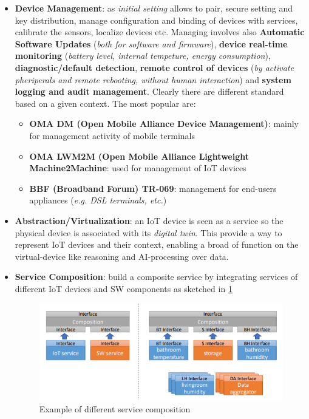 \documentclass[10pt,a4paper]{report}
\theoremstyle{definition}
\begin{document}
\begin{itemize}
	\item 
	\textbf{Device Management}: as \textit{initial setting} allows to pair, secure setting and key distribution, manage configuration and binding of devices with services, calibrate the sensors, localize devices etc. Managing involves also \textbf{Automatic Software Updates} (\textit{both for software and firmware}), \textbf{device real-time monitoring} (\textit{battery level, internal tempeture, energy consumption}), \textbf{diagnostic/default detection}, \textbf{remote control of devices} (\textit{by activate pheriperals and remote rebooting, without human interaction}) and \textbf{system logging and audit management}.
	Clearly there are different standard based on a given context. The most popular are:
	\begin{itemize}
		\item 
		\textbf{OMA DM (Open Mobile Alliance Device Management)}: mainly for management activity of mobile terminals
		\item 
		\textbf{OMA LWM2M (Open Mobile Alliance Lightweight Machine2Machine}: used for management of IoT devices
		\item 
		\textbf{BBF (Broadband Forum) TR-069}: management for end-users appliances (\textit{e.g. DSL terminals, etc.})
	\end{itemize}
	\item 
	\textbf{Abstraction/Virtualization}: an IoT device is seen as a service so the physical device is associated with its \textit{digital twin}. This provide a way to represent IoT devices and their context, enabling a broad of function on the virtual-device like reasoning and AI-processing over data.
	\item 
	\textbf{Service Composition}: build a composite service by integrating services of different IoT devices and SW components as sketched in \ref{composite-integration}
	\begin{figure}[h]
		\centering
		\includegraphics[scale=0.70]{images/Pasted image 20230221155324.png}
		\caption{Example of different service composition}
		\label{composite-integration}
	\end{figure}
	
\end{itemize}
\end{document}
